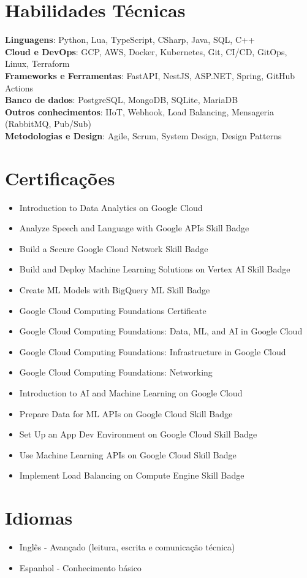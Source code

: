 \documentclass[letterpaper,11pt]{article}
\newcommand{\resumeItem}[1]{
  \item\small{
    {#1 \vspace{-2pt}}
  }
}
\newcommand{\resumeSubHeadingListStart}{\begin{itemize}[leftmargin=0.0in, label={}]}
\newcommand{\resumeSubHeadingListEnd}{\end{itemize}}
\begin{document}
\section{Habilidades Técnicas}
 \begin{itemize}[leftmargin=0.15in, label={}]
    \small{\item{
     \textbf{Linguagens}{: Python, Lua, TypeScript, CSharp, Java, SQL, C++} \\
     \textbf{Cloud e DevOps}{: GCP, AWS, Docker, Kubernetes, Git, CI/CD, GitOps, Linux, Terraform} \\
     \textbf{Frameworks e Ferramentas}{: FastAPI, NestJS, ASP.NET, Spring, GitHub Actions} \\
     \textbf{Banco de dados}{: PostgreSQL, MongoDB, SQLite, MariaDB} \\
     \textbf{Outros conhecimentos}{: IIoT, Webhook, Load Balancing, Mensageria (RabbitMQ, Pub/Sub)} \\
     \textbf{Metodologias e Design}{: Agile, Scrum, System Design, Design Patterns}
    }}
 \end{itemize}
 \vspace{-16pt}

\section{Certificações}
  \resumeSubHeadingListStart
 \begin{itemize}[leftmargin=0.15in, label={}]
        \resumeItem{Introduction to Data Analytics on Google Cloud}
        \resumeItem{Analyze Speech and Language with Google APIs Skill Badge}
        \resumeItem{Build a Secure Google Cloud Network Skill Badge}
        \resumeItem{Build and Deploy Machine Learning Solutions on Vertex AI Skill Badge}
        \resumeItem{Create ML Models with BigQuery ML Skill Badge}
        \resumeItem{Google Cloud Computing Foundations Certificate}
        \resumeItem{Google Cloud Computing Foundations: Data, ML, and AI in Google Cloud}
        \resumeItem{Google Cloud Computing Foundations: Infrastructure in Google Cloud}
        \resumeItem{Google Cloud Computing Foundations: Networking}
        \resumeItem{Introduction to AI and Machine Learning on Google Cloud}
        \resumeItem{Prepare Data for ML APIs on Google Cloud Skill Badge}
        \resumeItem{Set Up an App Dev Environment on Google Cloud Skill Badge}
        \resumeItem{Use Machine Learning APIs on Google Cloud Skill Badge}
        \resumeItem{Implement Load Balancing on Compute Engine Skill Badge}
    \end{itemize}
  \resumeSubHeadingListEnd
\vspace{-16pt}

\section{Idiomas}
  \resumeSubHeadingListStart
    \resumeItem{Inglês - Avançado (leitura, escrita e comunicação técnica)}
    \resumeItem{Espanhol - Conhecimento básico}
  \resumeSubHeadingListEnd
\end{document}
